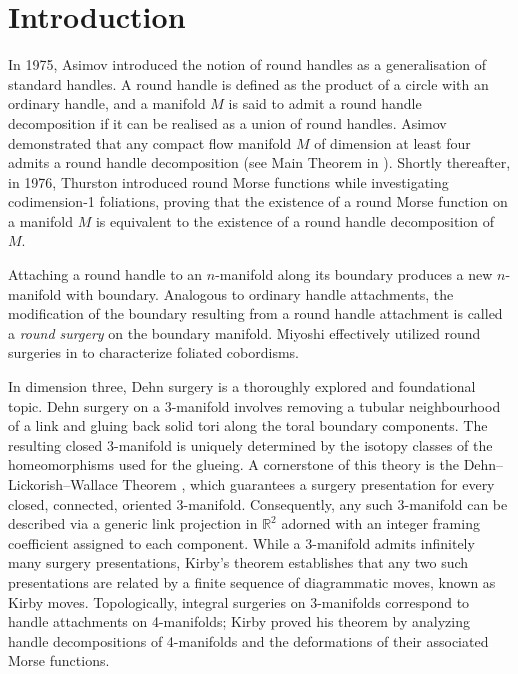 \documentclass{amsart}
\theoremstyle{plain}
\theoremstyle{remark}
\theoremstyle{definition}
\begin{document}
\maketitle

\section{Introduction}


In 1975, Asimov \cite{Asimov} introduced the notion of round handles as a generalisation of standard handles. A round handle is defined as the product of a circle with an ordinary handle, and a manifold $M$ is said to admit a round handle decomposition if it can be realised as a union of round handles. Asimov demonstrated that any compact flow manifold $M$ of dimension at least four admits a round handle decomposition (see Main Theorem in \cite{Asimov}). Shortly thereafter, in 1976, Thurston \cite{Thurs} introduced round Morse functions while investigating codimension-1 foliations, proving that the existence of a round Morse function on a manifold $M$ is equivalent to the existence of a round handle decomposition of $M$.

Attaching a round handle to an $n$-manifold along its boundary produces a new $n$-manifold with boundary. Analogous to ordinary handle attachments, the modification of the boundary resulting from a round handle attachment is called a \emph{round surgery} on the boundary manifold. Miyoshi effectively utilized round surgeries in \cite{Miyoshi} to characterize foliated cobordisms.

In dimension three, Dehn surgery is a thoroughly explored and foundational topic. Dehn surgery on a 3-manifold involves removing a tubular neighbourhood of a link and gluing back solid tori along the toral boundary components. The resulting closed 3-manifold is uniquely determined by the isotopy classes of the homeomorphisms used for the glueing. A cornerstone of this theory is the Dehn--Lickorish--Wallace Theorem \cite{L, W}, which guarantees a surgery presentation for every closed, connected, oriented 3-manifold. Consequently, any such 3-manifold can be described via a generic link projection in $\mathbb{R}^2$ adorned with an integer framing coefficient assigned to each component. While a 3-manifold admits infinitely many surgery presentations, Kirby's theorem \cite{RK, Book-GompfStip} establishes that any two such presentations are related by a finite sequence of diagrammatic moves, known as Kirby moves. Topologically, integral surgeries on 3-manifolds correspond to handle attachments on 4-manifolds; Kirby proved his theorem by analyzing handle decompositions of 4-manifolds and the deformations of their associated Morse functions.
\end{document}
